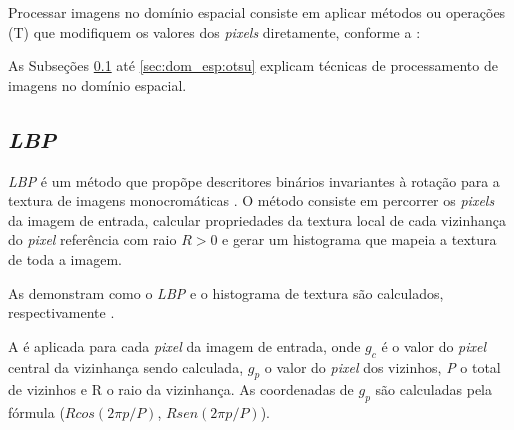 
\par Processar imagens no domínio espacial consiste em aplicar métodos ou operações (T) que modifiquem os valores dos \textit{pixels} diretamente, conforme a  \cite{gonsalez2006}:


\par As Subseções \ref{sec:dom_esp:lbp} até \ref{sec:dom_esp:otsu} explicam técnicas de processamento de imagens no domínio espacial.

\subsection{\textit{\acrfull{LBP}}}\label{sec:dom_esp:lbp}

\par \textit{\acrshort{LBP}} é um método que propõpe descritores binários invariantes à rotação para a textura de imagens monocromáticas \cite{ojala2002LBP}. O método consiste em percorrer os \textit{pixels} da imagem de entrada, calcular propriedades da textura local de cada vizinhança do \textit{pixel} referência com raio $R > 0$ e gerar um histograma que mapeia a textura de toda a imagem.

\par As  demonstram como o \textit{\acrshort{LBP}} e o histograma de textura são calculados, respectivamente \cite{ojala2002LBP}\cite{guo2010-CLBP}.

       
\noindent A  é aplicada para cada \textit{pixel} da imagem de entrada, onde $g_{c}$ é o valor do \textit{pixel} central da vizinhança sendo calculada, $g_{p}$ o valor do \textit{pixel} dos vizinhos, \textit{P} o total de vizinhos e R o raio da vizinhança. As coordenadas de $g_{p}$ são calculadas pela fórmula ($Rcos(2 \pi p/P)$, $Rsen(2 \pi p/P)$). 

